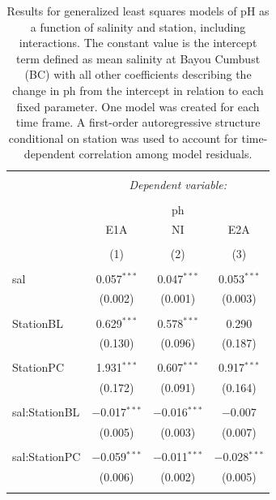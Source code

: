 \documentclass[letterpaper,12pt]{article}\usepackage[]{graphicx}\usepackage[]{color}
\begin{document}
\clearpage


\begin{table}[!htbp] \centering 
  \caption{Results for generalized least squares models of pH as a function of salinity and station, including interactions.  The constant value is the intercept term defined as mean salinity at Bayou Cumbust (BC) with all other coefficients describing the change in ph from the intercept in relation to each fixed parameter.  One model was created for each time frame.  A first-order autoregressive structure conditional on station was used to account for time-dependent correlation among model residuals.} 
  \label{} 
\begin{tabular}{@{\extracolsep{5pt}}lccc} 
\\[-1.8ex]\hline 
\hline \\[-1.8ex] 
 & \multicolumn{3}{c}{\textit{Dependent variable:}} \\ 
\cline{2-4} 
\\[-1.8ex] & \multicolumn{3}{c}{ph} \\ 
 & E1A & NI & E2A \\ 
\\[-1.8ex] & (1) & (2) & (3)\\ 
\hline \\[-1.8ex] 
 sal & 0.057$^{***}$ & 0.047$^{***}$ & 0.053$^{***}$ \\ 
  & (0.002) & (0.001) & (0.003) \\ 
  & & & \\ 
 StationBL & 0.629$^{***}$ & 0.578$^{***}$ & 0.290 \\ 
  & (0.130) & (0.096) & (0.187) \\ 
  & & & \\ 
 StationPC & 1.931$^{***}$ & 0.607$^{***}$ & 0.917$^{***}$ \\ 
  & (0.172) & (0.091) & (0.164) \\ 
  & & & \\ 
 sal:StationBL & $-$0.017$^{***}$ & $-$0.016$^{***}$ & $-$0.007 \\ 
  & (0.005) & (0.003) & (0.007) \\ 
  & & & \\ 
 sal:StationPC & $-$0.059$^{***}$ & $-$0.011$^{***}$ & $-$0.028$^{***}$ \\ 
  & (0.006) & (0.002) & (0.005) \\ 
  & & & \\ 

\end{tabular}
\end{table}
\end{document}
